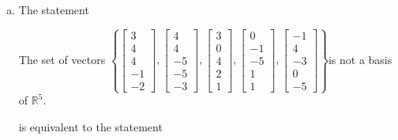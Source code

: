 \begin{exerciseAnswer}
\begin{enumerate}[(a)]
\item The statement 
\begin{center}\begin{minipage}{0.8\textwidth}
 The set of vectors \( \left\{ \left[\begin{array}{c}
3 \\
4 \\
4 \\
-1 \\
-2
\end{array}\right] , \left[\begin{array}{c}
4 \\
4 \\
-5 \\
-5 \\
-3
\end{array}\right] , \left[\begin{array}{c}
3 \\
0 \\
4 \\
2 \\
1
\end{array}\right] , \left[\begin{array}{c}
0 \\
-1 \\
-5 \\
1 \\
1
\end{array}\right] , \left[\begin{array}{c}
-1 \\
4 \\
-3 \\
0 \\
-5
\end{array}\right] \right\} \)is not a basis of \(\mathbb{R}^5\). 
\end{minipage}\end{center}
     is equivalent to the statement 
\begin{center}\begin{minipage}{0.8\textwidth}
 The set of vectors \( \left\{ \left[\begin{array}{c}
3 \\
4 \\
4 \\
-1 \\
-2
\end{array}\right] , \left[\begin{array}{c}
4 \\
4 \\

\end{array}
\end{minipage}
\end{center}
\end{enumerate}
\end{exerciseAnswer}
